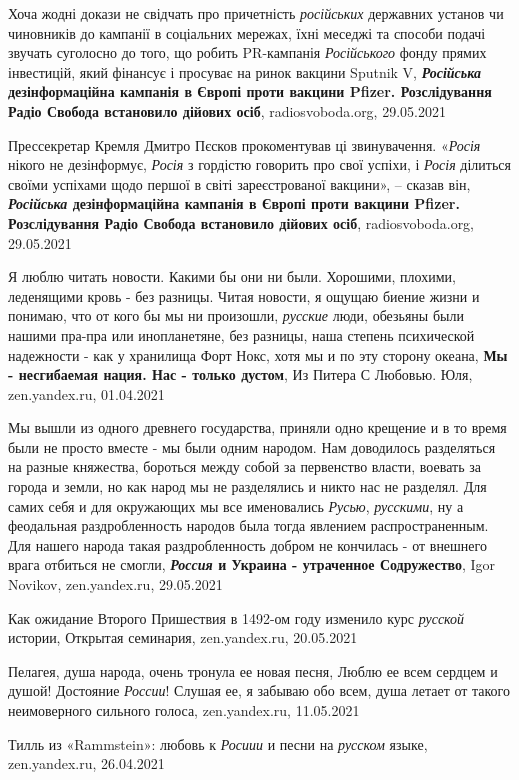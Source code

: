 Хоча жодні докази не свідчать про причетність \emph{російських} державних
установ чи чиновників до кампанії в соціальних мережах, їхні меседжі та способи
подачі звучать суголосно до того, що робить PR-кампанія \emph{Російського}
фонду прямих інвестицій, який фінансує і просуває на ринок вакцини Sputnik V,
\textbf{\emph{Російська} дезінформаційна кампанія в Європі проти вакцини
Pfizer. Розслідування Радіо Свобода встановило дійових осіб}, radiosvoboda.org,
29.05.2021

Прессекретар Кремля Дмитро Пєсков прокоментував ці звинувачення. «\emph{Росія}
нікого не дезінформує, \emph{Росія} з гордістю говорить про свої успіхи, і
\emph{Росія} ділиться своїми успіхами щодо першої в світі зареєстрованої
вакцини», – сказав він, \textbf{\emph{Російська} дезінформаційна кампанія в
Європі проти вакцини Pfizer. Розслідування Радіо Свобода встановило дійових
осіб}, radiosvoboda.org, 29.05.2021

Я люблю читать новости. Какими бы они ни были. Хорошими, плохими, леденящими
кровь - без разницы. Читая новости, я ощущаю биение жизни и понимаю, что от
кого бы мы ни произошли, \emph{русские} люди, обезьяны были нашими пра-пра или
инопланетяне, без разницы, наша степень психической надежности - как у
хранилища Форт Нокс, хотя мы и по эту сторону океана, \textbf{Мы - несгибаемая
нация. Нас - только дустом}, Из Питера С Любовью. Юля, zen.yandex.ru,
01.04.2021

Мы вышли из одного древнего государства, приняли одно крещение и в то время
были не просто вместе - мы были одним народом. Нам доводилось разделяться на
разные княжества, бороться между собой за первенство власти, воевать за города
и земли, но как народ мы не разделялись и никто нас не разделял. Для самих себя
и для окружающих мы все именовались \emph{Русью}, \emph{русскими}, ну а
феодальная раздробленность народов была тогда явлением распространенным. Для
нашего народа такая раздробленность добром не кончилась - от внешнего врага
отбиться не смогли, \textbf{\emph{Россия} и Украина - утраченное Содружество},
Igor Novikov, zen.yandex.ru, 29.05.2021

Как ожидание Второго Пришествия в 1492-ом году изменило курс \emph{русской}
истории, Открытая семинария, zen.yandex.ru, 20.05.2021

Пелагея, душа народа, очень тронула ее новая песня, Люблю ее всем сердцем и
душой! Достояние \emph{России}! Слушая ее, я забываю обо всем, душа летает от
такого неимоверного сильного голоса, zen.yandex.ru, 11.05.2021

Тилль из «Rammstein»: любовь к \emph{Росиии} и песни на \emph{русском} языке,
zen.yandex.ru, 26.04.2021

